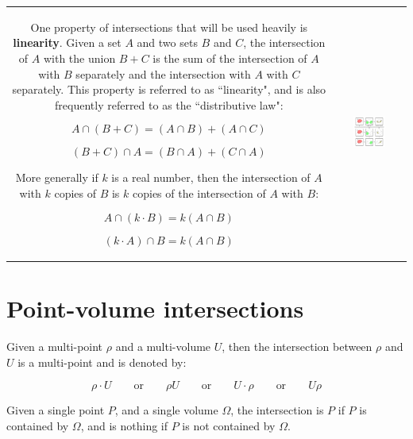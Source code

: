 \begin{tabular}{cc}
\parbox{0.5\textwidth}{
One property of intersections that will be used heavily is {\bf linearity}. Given a set \(A\) and two sets \(B\) and \(C\), the intersection of \(A\) with the union \(B + C\) is the sum of the intersection of \(A\) with \(B\) separately and the intersection with \(A\) with \(C\) separately. This property is referred to as ``linearity", and is also frequently referred to as the ``distributive law":

\[A \cap (B + C) = (A \cap B) + (A \cap C)\]

\[(B + C) \cap A = (B \cap A) + (C \cap A)\]

More generally if \(k\) is a real number, then the intersection of \(A\) with \(k\) copies of \(B\) is \(k\) copies of the intersection of \(A\) with \(B\):

\[A \cap (k \cdot B) = k(A \cap B)\]

\[(k \cdot A) \cap B = k(A \cap B)\]

} & \parbox{0.5\textwidth}{
\includegraphics[width = 0.5\textwidth]{Intersections/intersection_distributive_law}
}
\end{tabular}


\section{Point-volume intersections}

Given a multi-point \(\rho\) and a multi-volume \(U\), then the intersection between \(\rho\) and \(U\) is a multi-point and is denoted by:

\[\rho \cdot U \quad\quad\text{or}\quad\quad \rho U \quad\quad\text{or}\quad\quad U \cdot \rho \quad\quad\text{or}\quad\quad U \rho\]

Given a single point \(P\), and a single volume \(\Omega\), the intersection is \(P\) if \(P\) is contained by \(\Omega\), and is nothing if \(P\) is not contained by \(\Omega\). 

